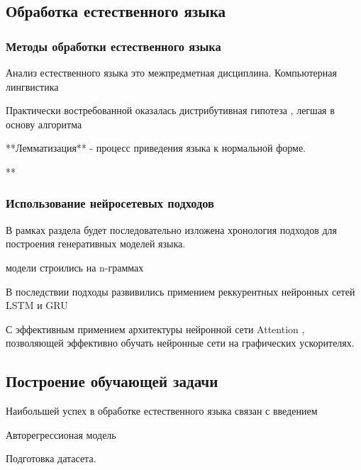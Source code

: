 \documentclass{mipt-thesis-bs}
\begin{document}
\subsection{Обработка естественного языка}





\subsubsection{Методы обработки естественного языка}

Анализ естественного языка это межпредметная дисциплина.
Компьютерная лингвистика

Практически востребованной оказалась дистрибутивная гипотеза ,
легшая в основу алгоритма \cite{NIPS2013_9aa42b31}


**Лемматизация** - процесс приведения языка к нормальной форме.

**


\subsubsection{Использование нейросетевых подходов}

В рамках раздела будет последовательно изложена хронология подходов
для построения генеративных моделей языка.

 модели строились на n-граммах \cite{heafield-2011-kenlm}

 


В последствии подходы развивились примением реккурентных нейронных сетей LSTM  и GRU



С эффективным примением архитектуры нейронной сети Attention \cite{NIPS2017_3f5ee243}, позволяющей эффективно обучать нейронные сети на графических ускорителях. 





\subsection{Построение обучающей задачи}







Наибольшей успех в обработке естественного языка связан с
введением 

Авторегрессионая модель

Подготовка датасета. 


\printbib
\end{document}
